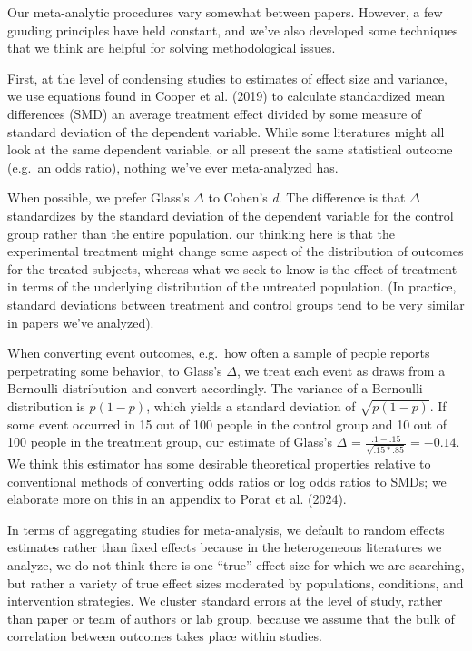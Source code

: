 \documentclass[
  man]{apa6}
\begin{document}
Our meta-analytic procedures vary somewhat between papers. However, a few guuding principles have held constant, and we've also developed some techniques that we think are helpful for solving methodological issues.

First, at the level of condensing studies to estimates of effect size and variance, we use equations found in Cooper et al. (2019) to calculate standardized mean differences (SMD) \textemdash an average treatment effect divided by some measure of standard deviation of the dependent variable. While some literatures might all look at the same dependent variable, or all present the same statistical outcome (e.g.~an odds ratio), nothing we've ever meta-analyzed has.

When possible, we prefer Glass's \(\Delta\) to Cohen's \emph{d}. The difference is that \(\Delta\) standardizes by the standard deviation of the dependent variable for the control group rather than the entire population. our thinking here is that the experimental treatment might change some aspect of the distribution of outcomes for the treated subjects, whereas what we seek to know is the effect of treatment in terms of the underlying distribution of the untreated population. (In practice, standard deviations between treatment and control groups tend to be very similar in papers we've analyzed).

When converting event outcomes, e.g.~how often a sample of people reports perpetrating some behavior, to Glass's \(\Delta\), we treat each event as draws from a Bernoulli distribution and convert accordingly. The variance of a Bernoulli distribution is \(p (1-p)\), which yields a standard deviation of \(\sqrt{p(1-p)}\). If some event occurred in 15 out of 100 people in the control group and 10 out of 100 people in the treatment group, our estimate of Glass's \(\Delta\) = \(\frac{.1 - .15}{\sqrt{.15 * .85}} = -0.14\). We think this estimator has some desirable theoretical properties relative to conventional methods of converting odds ratios or log odds ratios to SMDs; we elaborate more on this in an appendix to Porat et al. (2024).

In terms of aggregating studies for meta-analysis, we default to random effects estimates rather than fixed effects because in the heterogeneous literatures we analyze, we do not think there is one ``true'' effect size for which we are searching, but rather a variety of true effect sizes moderated by populations, conditions, and intervention strategies. We cluster standard errors at the level of study, rather than paper or team of authors or lab group, because we assume that the bulk of correlation between outcomes takes place within studies.
\end{document}
